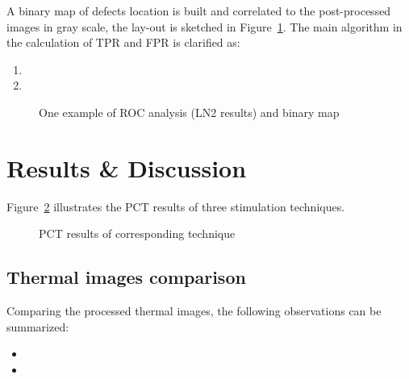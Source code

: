 \documentclass[]{spie}  %
\begin{document}
A binary map of defects location is built and correlated to the post-processed images in gray scale, the lay-out is sketched in Figure~\ref{binary}. The main algorithm in the calculation of TPR and FPR is clarified as:
\begin{enumerate}
   \item 
   \item 
\end{enumerate}


\begin{figure}[ht]
   \centering
   \caption{One example of ROC analysis (LN2 results) and binary map}
   \label{binary}
\end{figure}



\section{Results \& Discussion} %
\label{sec:results_&_discussion}
Figure~\ref{PCT_result} illustrates the PCT results of three stimulation techniques.
\begin{figure}[ht]
    \centering
    \hspace{10pt}
    \hspace{10pt}
    \hspace{10pt}
    \hspace{10pt}
    \caption{PCT results of corresponding technique}
    \label{PCT_result}
\end{figure}

\subsection{Thermal images comparison} 
Comparing the processed thermal images, the following observations can be summarized:  
\begin{itemize}
    \item 
    \item 
\end{itemize}
\end{document}
